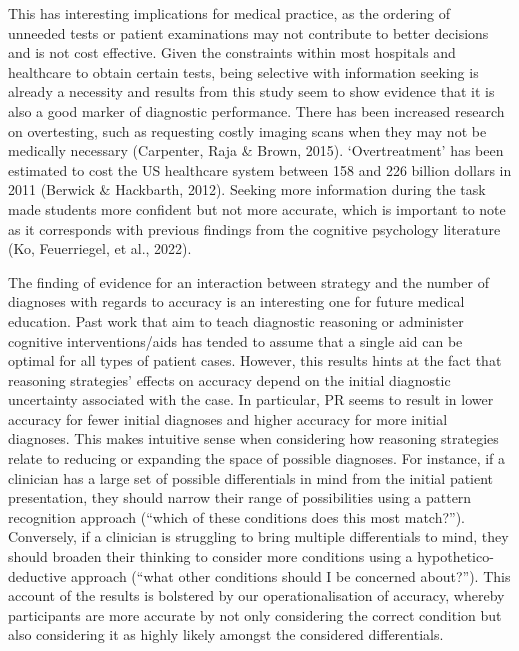 \documentclass[a4paper, nobind]{templates/ociamthesis}
\begin{document}
This has interesting implications for medical practice, as the ordering of unneeded tests or patient examinations may not contribute to better decisions and is not cost effective. Given the constraints within most hospitals and healthcare to obtain certain tests, being selective with information seeking is already a necessity and results from this study seem to show evidence that it is also a good marker of diagnostic performance. There has been increased research on overtesting, such as requesting costly imaging scans when they may not be medically necessary (Carpenter, Raja \& Brown, 2015). `Overtreatment' has been estimated to cost the US healthcare system between 158 and 226 billion dollars in 2011 (Berwick \& Hackbarth, 2012). Seeking more information during the task made students more confident but not more accurate, which is important to note as it corresponds with previous findings from the cognitive psychology literature (Ko, Feuerriegel, et al., 2022).

The finding of evidence for an interaction between strategy and the number of diagnoses with regards to accuracy is an interesting one for future medical education. Past work that aim to teach diagnostic reasoning or administer cognitive interventions/aids has tended to assume that a single aid can be optimal for all types of patient cases. However, this results hints at the fact that reasoning strategies' effects on accuracy depend on the initial diagnostic uncertainty associated with the case. In particular, PR seems to result in lower accuracy for fewer initial diagnoses and higher accuracy for more initial diagnoses. This makes intuitive sense when considering how reasoning strategies relate to reducing or expanding the space of possible diagnoses. For instance, if a clinician has a large set of possible differentials in mind from the initial patient presentation, they should narrow their range of possibilities using a pattern recognition approach (``which of these conditions does this most match?''). Conversely, if a clinician is struggling to bring multiple differentials to mind, they should broaden their thinking to consider more conditions using a hypothetico-deductive approach (``what other conditions should I be concerned about?''). This account of the results is bolstered by our operationalisation of accuracy, whereby participants are more accurate by not only considering the correct condition but also considering it as highly likely amongst the considered differentials.
\end{document}

